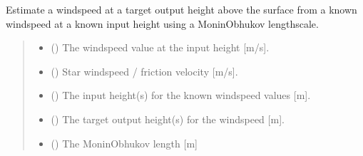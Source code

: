 \documentclass[letterpaper,10pt,english]{sphinxmanual}
\begin{document}
\begin{fulllineitems}
\label{\detokenize{users_guide:AirSeaFluxCode.height_subs.adjust_wind_speed}}
\pysigstartsignatures
\pysiglinewithargsret
{}
{\sphinxparamcomma {}\sphinxparamcomma {}\sphinxparamcomma {}\sphinxparamcomma {}\sphinxparamcomma {}}
{}
\pysigstopsignatures
\sphinxAtStartPar
Estimate a wind\sphinxhyphen{}speed at a target output height above the surface from a
known wind\sphinxhyphen{}speed at a known input height using a Monin\sphinxhyphen{}Obhukov length\sphinxhyphen{}scale.
\begin{quote}\begin{description}
\begin{itemize}
\item {}
\sphinxAtStartPar
{} () \textendash{} The wind\sphinxhyphen{}speed value at the input height  {[}m/s{]}.

\item {}
\sphinxAtStartPar
{} () \textendash{} Star wind\sphinxhyphen{}speed / friction velocity {[}m/s{]}.

\item {}
\sphinxAtStartPar
{} (\sphinxstyleliteralemphasis{\sphinxupquote{ | }}) \textendash{} The input height(s) for the known wind\sphinxhyphen{}speed values {[}m{]}.

\item {}
\sphinxAtStartPar
{} (\sphinxstyleliteralemphasis{\sphinxupquote{ | }}) \textendash{} The target output height(s) for the wind\sphinxhyphen{}speed {[}m{]}.

\item {}
\sphinxAtStartPar
{} () \textendash{} The Monin\sphinxhyphen{}Obhukov length {[}m{]}


\end{itemize}
\end{description}
\end{quote}
\end{fulllineitems}
\end{document}

